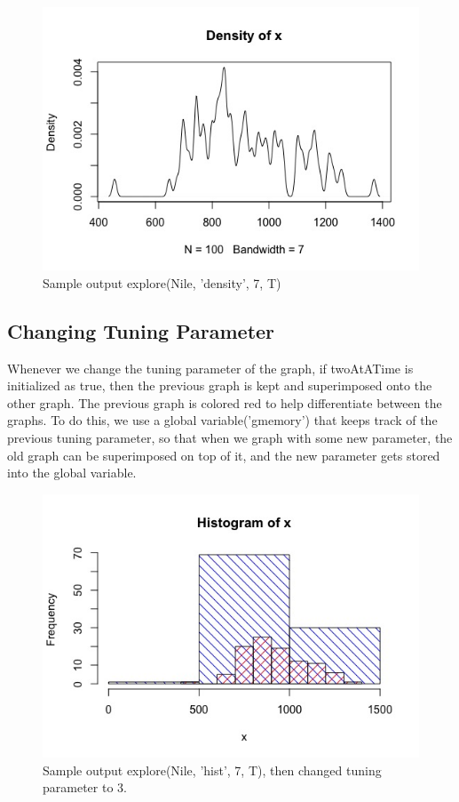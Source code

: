 \documentclass{article}
\begin{document}
\begin{figure}[H]
\centering
\includegraphics[scale=0.5]{Nile, 7 Tuning param.jpeg}
\caption{Sample output explore(Nile, 'density', 7, T)}
\label{fig:Nile density graph 7}
\end{figure}


\subsection{Changing Tuning Parameter}
Whenever we change the tuning parameter of the graph, if twoAtATime is initialized as true, then the previous graph is kept and superimposed onto the other graph. The previous graph is colored red to help differentiate between the graphs. To do this, we use a global variable('gmemory') that keeps track of the previous tuning parameter, so that when we graph with some new parameter, the old graph can be superimposed on top of it, and the new parameter gets stored into the global variable.

\begin{figure}[H]
\centering
\includegraphics[scale=0.5]{Nile, 3 superimposed on 7 hist.jpeg}
\caption{Sample output explore(Nile, 'hist', 7, T), then changed tuning parameter to 3.}
\label{fig:Nile histogram 3 on 7}
\end{figure}
\end{document}
